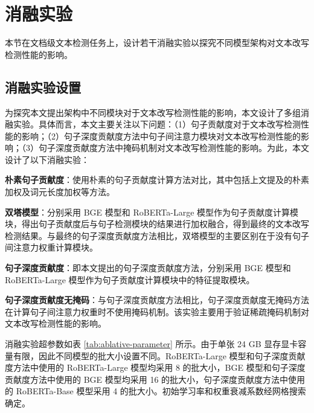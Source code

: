 \section{消融实验}
\label{sec:method-experiment-ablative}

本节在文档级文本检测任务上，设计若干消融实验以探究不同模型架构对文本改写检测性能的影响。

\subsection{消融实验设置}
\label{sec:method-experiment-ablative-design}

为探究本文提出架构中不同模块对于文本改写检测性能的影响，本文设计了多组消融实验。具体而言，本文主要关注以下问题：（1）句子贡献度对于文本改写检测性能的影响；（2）句子深度贡献度方法中句子间注意力模块对文本改写检测性能的影响；（3）句子深度贡献度方法中掩码机制对文本改写检测性能的影响。为此，本文设计了以下消融实验：

\textbf{朴素句子贡献度}：使用朴素的句子贡献度计算方法对比，其中包括上文提及的朴素加权及词元长度加权等方法。

\textbf{双塔模型}：分别采用 BGE 模型和 RoBERTa-Large 模型作为句子贡献度计算模块，得出句子贡献度后与句子检测模块的结果进行加权融合，得到最终的文本改写检测结果。与最终的句子深度贡献度方法相比，双塔模型的主要区别在于没有句子间注意力权重计算模块。

\textbf{句子深度贡献度}：即本文提出的句子深度贡献度方法，分别采用 BGE 模型和 RoBERTa-Large 模型作为句子贡献度计算模块中的特征提取模块。

\textbf{句子深度贡献度无掩码}：与句子深度贡献度方法相比，句子深度贡献度无掩码方法在计算句子间注意力权重时不使用掩码机制。该实验主要用于验证稀疏掩码机制对文本改写检测性能的影响。

消融实验超参数如表 \ref{tab:ablative-parameter} 所示。由于单张 24 GB 显存显卡容量有限，因此不同模型的批大小设置不同。RoBERTa-Large 模型和句子深度贡献度方法中使用的 RoBERTa-Large 模型均采用 8 的批大小，BGE 模型和句子深度贡献度方法中使用的 BGE 模型均采用 16 的批大小，句子深度贡献度方法中使用的 RoBERTa-Base 模型采用 4 的批大小。初始学习率和权重衰减系数经网格搜索确定。

